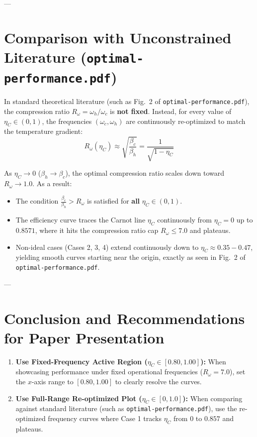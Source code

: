 \documentclass[11pt,a4paper]{article}
\begin{document}
---

\section{Comparison with Unconstrained Literature (\texttt{optimal-performance.pdf})}

In standard theoretical literature (such as Fig.~2 of \texttt{optimal-performance.pdf}), the compression ratio $R_\omega = \omega_h / \omega_c$ is \textbf{not fixed}. Instead, for every value of $\eta_C \in (0, 1)$, the frequencies $(\omega_c, \omega_h)$ are continuously re-optimized to match the temperature gradient:
\begin{equation}
R_\omega(\eta_C) \approx \sqrt{\frac{\beta_c}{\beta_h}} = \frac{1}{\sqrt{1 - \eta_C}}
\end{equation}

As $\eta_C \to 0$ ($\beta_h \to \beta_c$), the optimal compression ratio scales down toward $R_\omega \to 1.0$. As a result:
\begin{itemize}
    \item The condition $\frac{\beta_c}{\beta_h} > R_\omega$ is satisfied for \textbf{all} $\eta_C \in (0, 1)$.
    \item The efficiency curve traces the Carnot line $\eta_C$ continuously from $\eta_C = 0$ up to $0.8571$, where it hits the compression ratio cap $R_\omega \le 7.0$ and plateaus.
    \item Non-ideal cases (Cases 2, 3, 4) extend continuously down to $\eta_C \approx 0.35 - 0.47$, yielding smooth curves starting near the origin, exactly as seen in Fig.~2 of \texttt{optimal-performance.pdf}.
\end{itemize}

---

\section{Conclusion and Recommendations for Paper Presentation}
\begin{enumerate}
    \item \textbf{Use Fixed-Frequency Active Region ($\eta_C \in [0.80, 1.00]$):} When showcasing performance under fixed operational frequencies ($R_\omega = 7.0$), set the $x$-axis range to $[0.80, 1.00]$ to clearly resolve the curves.
    \item \textbf{Use Full-Range Re-optimized Plot ($\eta_C \in [0, 1.0]$):} When comparing against standard literature (such as \texttt{optimal-performance.pdf}), use the re-optimized frequency curves where Case 1 tracks $\eta_C$ from $0$ to $0.857$ and plateaus.
\end{enumerate}
\end{document}
